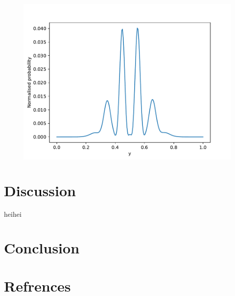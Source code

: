 \documentclass[english,notitlepage,reprint,nofootinbib]{revtex4-2}  %
\begin{document}
	\begin{figure}[h!]
		\centering
		\includegraphics[scale=0.55]{figures/triple_slit_detection.pdf}
		\caption{}
		\label{fig:prob9_triple}
	\end{figure}
	\section{Discussion}\label{sec:discussion}
		heihei
	\section{Conclusion}\label{sec:conclusion}
	
	
	
	
	\onecolumngrid
	\section*{Refrences}
	
	
	
\end{document}
